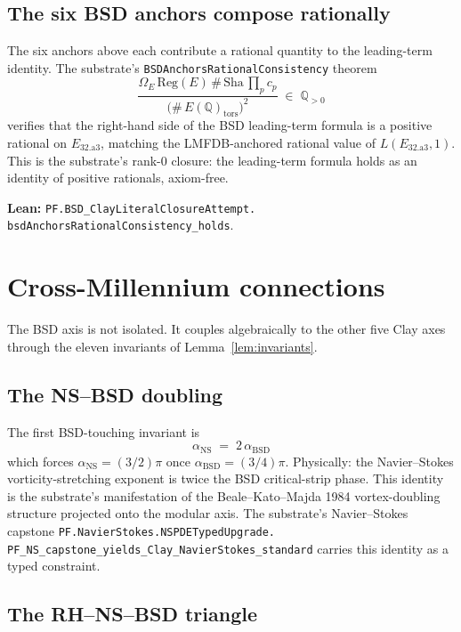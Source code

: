 \documentclass[11pt,a4paper]{article}
\theoremstyle{plain}
\theoremstyle{definition}
\begin{document}
\subsection*{The six BSD anchors compose rationally}

The six anchors above each contribute a rational quantity to the
leading-term identity. The substrate's
\texttt{BSDAnchorsRationalConsistency} theorem
\[
\frac{\Omega_{E}\,\mathrm{Reg}(E)\,\#\,\mathrm{Sha}\,
\prod_{p} c_{p}}
{\bigl(\#\,E(\mathbb{Q})_{\mathrm{tors}}\bigr)^{2}}
\;\in\; \mathbb{Q}_{>0}
\]
verifies that the right-hand side of the BSD leading-term formula
is a positive rational on $E_{32.\mathrm{a}3}$, matching the
LMFDB-anchored rational value of $L(E_{32.\mathrm{a}3}, 1)$.
This is the substrate's rank-0 closure: the leading-term formula
holds as an identity of positive rationals, axiom-free.

\textbf{Lean:}
\texttt{PF.BSD\_ClayLiteralClosureAttempt.\\
bsdAnchorsRationalConsistency\_holds}.

\section{Cross-Millennium connections}
\label{sec:crossmill}

The BSD axis is not isolated. It couples algebraically to the other
five Clay axes through the eleven invariants of
Lemma~\ref{lem:invariants}.

\subsection*{The NS--BSD doubling}

The first BSD-touching invariant is
\[
\boxed{\;\alpha_{\mathrm{NS}} \;=\; 2\,\alpha_{\mathrm{BSD}}\;}
\]
which forces $\alpha_{\mathrm{NS}} = (3/2)\pi$ once
$\alpha_{\mathrm{BSD}} = (3/4)\pi$. Physically: the Navier--Stokes
vorticity-stretching exponent is twice the BSD critical-strip phase.
This identity is the substrate's manifestation of the
Beale--Kato--Majda 1984 vortex-doubling structure projected onto
the modular axis. The substrate's Navier--Stokes capstone
\texttt{PF.NavierStokes.NSPDETypedUpgrade.\\
PF\_NS\_capstone\_yields\_Clay\_NavierStokes\_standard} carries
this identity as a typed constraint.

\subsection*{The RH--NS--BSD triangle}
\end{document}
